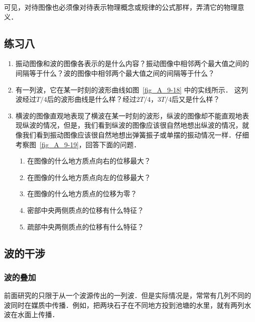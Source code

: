 可见，对待图像也必须像对待表示物理概念或规律的公式那样，弄清它的物理意义．

\subsection*{练习八}
\begin{enumerate}
    \item 振动图像和波的图像各表示的是什么内容？振动图像中相邻两个最大值之间的间隔等于什么？波的图像中相邻两个最大值之间的间隔等于什么？
    \item 有一列波，它在某一时刻的波形曲线如图~\ref{fig_A_9-18} 中的实线所示．
    这列波经过$T/4$后的波形曲线是什么样？经过$2T/4$，$3T/4$后又是什么样？
    \item 横波的图像直观地表现了横波在某一时刻的波形，纵波的图像却不能直观地表现纵波的情况，但是，我们看到纵波的图像应该很自然地想出纵波的情况，就像我们看到振动图像应该很自然地想出弹簧振子或单摆的振动情况一样．仔细考察图~\ref{fig_A_9-19}，回答下面的问题．
    \begin{enumerate}
        \item 在图像的什么地方质点向右的位移最大？
        \item 在图像的什么地方质点向左的位移最大？
        \item 在图像的什么地方质点的位移为零？
        \item 密部中央两侧质点的位移有什么特征？
        \item 疏部中央两侧质点的位移有什么特征？
    \end{enumerate}
\end{enumerate}

\subsection{波的干涉}
\subsubsection{波的叠加} 

前面研究的只限于从一个波源传出的一列波．但是实际情况是，常常有几列不同的波同时在媒质中传播．例如，把两块石子在不同地方投到池塘的水里，就有两列水波在水面上传播．

